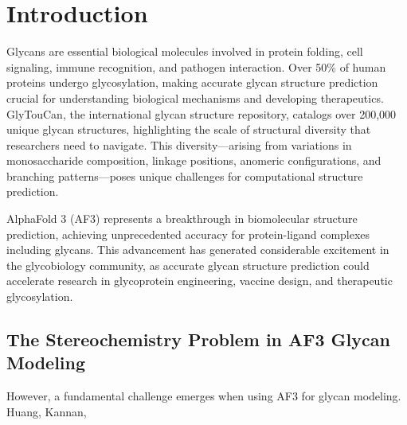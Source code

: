 \documentclass[11pt,a4paper]{article}
\begin{document}
\section{Introduction}

Glycans are essential biological molecules involved in protein folding, cell signaling, immune recognition, and pathogen interaction. Over 50\% of human proteins undergo glycosylation, making accurate glycan structure prediction crucial for understanding biological mechanisms and developing therapeutics. GlyTouCan, the international glycan structure repository, catalogs over 200,000 unique glycan structures, highlighting the scale of structural diversity that researchers need to navigate. This diversity---arising from variations in monosaccharide composition, linkage positions, anomeric configurations, and branching patterns---poses unique challenges for computational structure prediction.

AlphaFold 3 (AF3) represents a breakthrough in biomolecular structure prediction, achieving unprecedented accuracy for protein-ligand complexes including glycans. This advancement has generated considerable excitement in the glycobiology community, as accurate glycan structure prediction could accelerate research in glycoprotein engineering, vaccine design, and therapeutic glycosylation.

\subsection{The Stereochemistry Problem in AF3 Glycan Modeling}

However, a fundamental challenge emerges when using AF3 for glycan modeling. Huang, Kannan,
\end{document}

